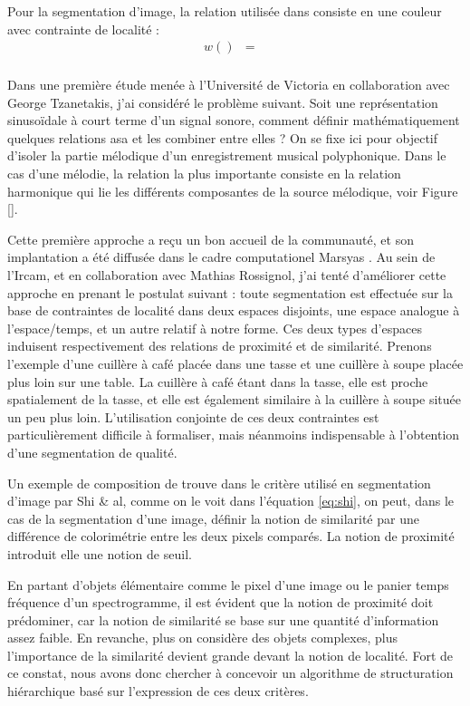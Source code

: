 Pour la segmentation d'image, la relation utilisée dans consiste en une couleur avec contrainte de localité :
\begin{eqnarray}
w() &=& \frac{}{} \\
&&
\label{eq:shi}
\end{eqnarray}

Dans une première étude menée à l'Université de Victoria en collaboration avec George Tzanetakis, j'ai considéré le problème suivant. Soit une représentation sinusoïdale à court terme d'un signal sonore, comment définir mathématiquement quelques relations asa et les combiner entre elles ? On se fixe ici pour objectif d'isoler la partie mélodique d'un enregistrement musical polyphonique. Dans le cas d'une mélodie, la relation la plus importante consiste en la relation harmonique qui lie les différents composantes de la source mélodique, voir Figure \ref{}.

Cette première approche a reçu un bon accueil de la communauté\cite{conf, lagrangeTaslp08}, et son implantation a été diffusée dans le cadre computationel Marsyas \cite{}. Au sein de l'Ircam, et en collaboration avec Mathias Rossignol, j'ai tenté d'améliorer cette approche en prenant le postulat suivant : toute segmentation est effectuée sur la base de contraintes de localité dans deux espaces disjoints, une espace analogue à l'espace/temps, et un autre relatif à notre forme. Ces deux types d'espaces induisent respectivement des relations de proximité et de similarité. Prenons l'exemple d'une cuillère à café placée dans une tasse et une cuillère à soupe placée plus loin sur une table. La cuillère à café étant dans la tasse, elle est proche spatialement de la tasse, et elle est également similaire à la cuillère à soupe située un peu plus loin. L'utilisation conjointe de ces deux contraintes est particulièrement difficile à formaliser, mais néanmoins indispensable à l'obtention d'une segmentation de qualité.

Un exemple de composition de trouve dans le critère utilisé en segmentation d'image par Shi \& al, comme on le voit dans l'équation \ref{eq:shi}, on peut, dans le cas de la segmentation d'une image, définir la notion de similarité par une différence de colorimétrie entre les deux pixels comparés. La notion de proximité introduit elle une notion de seuil.

En partant d'objets élémentaire comme le pixel d'une image ou le panier temps fréquence d'un spectrogramme, il est évident que la notion de proximité doit prédominer, car la notion de similarité se base sur une quantité d'information assez faible.  En revanche, plus on considère des objets complexes, plus l'importance de la similarité devient grande devant la notion de localité. Fort de ce constat, nous avons donc chercher à concevoir un algorithme de structuration hiérarchique basé sur l'expression de ces deux critères.

